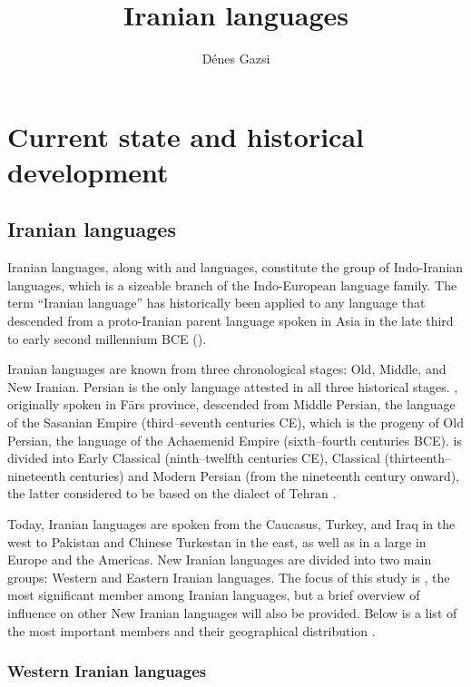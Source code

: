 \documentclass[output=paper]{langsci/langscibook}
\author{Dénes Gazsi}
\title{Iranian languages}
\begin{document}
\maketitle

\section{Current state and historical development}

\subsection{Iranian languages}

Iranian languages, along with  and  languages, constitute the group of Indo-Iranian languages, which is a sizeable branch of the Indo-European language family. The term ``Iranian language'' has historically been applied to any language that descended from a proto-Iranian parent language spoken in  Asia in the late third to early second millennium BCE (\citealt{Skjærvø2012}).

Iranian languages are known from three chronological stages: Old, Middle, and New Iranian. Persian is the only language attested in all three historical stages. , originally spoken in Fārs province, descended from Middle Persian, the language of the Sasanian Empire (third–seventh centuries CE), which is the progeny of Old Persian, the language of the Achaemenid Empire (sixth–fourth centuries BCE).  is divided into Early {Classical} (ninth–twelfth centuries CE), {Classical} (thirteenth–nineteenth centuries) and Modern Persian (from the nineteenth century onward), the latter considered to be based on the dialect of Tehran \citep[427]{Jeremiás2003}.

Today, Iranian languages are spoken from the Caucasus, Turkey, and Iraq in the west to Pakistan and Chinese Turkestan in the east, as well as in a large  in Europe and the Americas. New Iranian languages are divided into two main groups: {Western} and {Eastern} Iranian languages. The focus of this study is , the most significant member among Iranian languages, but a brief overview of  influence on other New Iranian languages will also be provided. Below is a list of the most important members and their geographical distribution \citep[246]{Schmitt1989}.


\subsubsection{Western Iranian languages}
\end{document}
